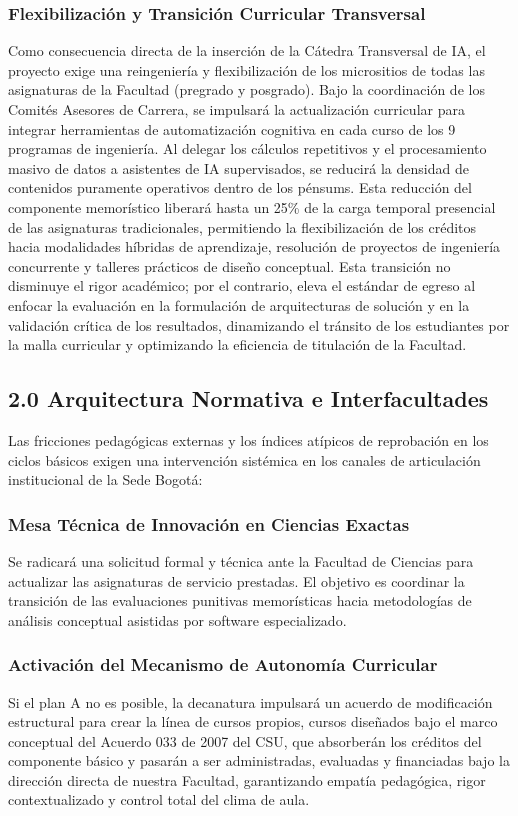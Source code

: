 \documentclass[journal,10pt,twocolumn,letterpaper]{IEEEtran}
\begin{document}
\subsubsection{Flexibilización y Transición Curricular Transversal}
Como consecuencia directa de la inserción de la Cátedra Transversal de IA, el proyecto exige una reingeniería y flexibilización de los micrositios de todas las asignaturas de la Facultad (pregrado y posgrado). Bajo la coordinación de los Comités Asesores de Carrera, se impulsará la actualización curricular para integrar herramientas de automatización cognitiva en cada curso de los 9 programas de ingeniería. Al delegar los cálculos repetitivos y el procesamiento masivo de datos a asistentes de IA supervisados, se reducirá la densidad de contenidos puramente operativos dentro de los pénsums. Esta reducción del componente memorístico liberará hasta un 25\% de la carga temporal presencial de las asignaturas tradicionales, permitiendo la flexibilización de los créditos hacia modalidades híbridas de aprendizaje, resolución de proyectos de ingeniería concurrente y talleres prácticos de diseño conceptual. Esta transición no disminuye el rigor académico; por el contrario, eleva el estándar de egreso al enfocar la evaluación en la formulación de arquitecturas de solución y en la validación crítica de los resultados, dinamizando el tránsito de los estudiantes por la malla curricular y optimizando la eficiencia de titulación de la Facultad.

\subsection{2.0 Arquitectura Normativa e Interfacultades}
Las fricciones pedagógicas externas y los índices atípicos de reprobación en los ciclos básicos exigen una intervención sistémica en los canales de articulación institucional de la Sede Bogotá:

\subsubsection{Mesa Técnica de Innovación en Ciencias Exactas}
Se radicará una solicitud formal y técnica ante la Facultad de Ciencias para actualizar las asignaturas de servicio prestadas. El objetivo es coordinar la transición de las evaluaciones punitivas memorísticas hacia metodologías de análisis conceptual asistidas por software especializado.

\subsubsection{Activación del Mecanismo de Autonomía Curricular}
Si el plan A no es posible, la decanatura impulsará un acuerdo de modificación estructural para crear la línea de cursos propios, cursos diseñados bajo el marco conceptual del Acuerdo 033 de 2007 del CSU, que absorberán los créditos del componente básico y pasarán a ser administradas, evaluadas y financiadas bajo la dirección directa de nuestra Facultad, garantizando empatía pedagógica, rigor contextualizado y control total del clima de aula.
\end{document}
